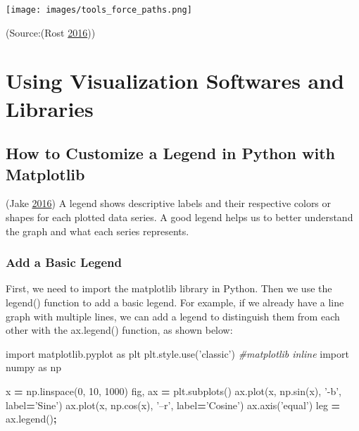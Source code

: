 \documentclass[]{book}
\newenvironment{Shaded}{\begin{snugshade}}{\end{snugshade}}
\newcommand{\CommentTok}[1]{\textcolor[rgb]{0.56,0.35,0.01}{\textit{#1}}}
\newcommand{\DecValTok}[1]{\textcolor[rgb]{0.00,0.00,0.81}{#1}}
\newcommand{\ImportTok}[1]{#1}
\newcommand{\NormalTok}[1]{#1}
\newcommand{\OperatorTok}[1]{\textcolor[rgb]{0.81,0.36,0.00}{\textbf{#1}}}
\newcommand{\StringTok}[1]{\textcolor[rgb]{0.31,0.60,0.02}{#1}}
\begin{document}
\texttt{[image: images/tools\_force\_paths.png]}

(Source:(Rost \protect\hyperlink{ref-different_tools}{2016}))

\hypertarget{using-visualization-softwares-and-libraries}{%
\section{Using Visualization Softwares and Libraries}\label{using-visualization-softwares-and-libraries}}

\hypertarget{how-to-customize-a-legend-in-python-with-matplotlib}{%
\subsection{How to Customize a Legend in Python with Matplotlib}\label{how-to-customize-a-legend-in-python-with-matplotlib}}

(Jake \protect\hyperlink{ref-PythonDataScienceHandbook}{2016})
A legend shows descriptive labels and their respective colors or shapes for each plotted data series. A good legend helps us to better understand the graph and what each series represents.

\hypertarget{add-a-basic-legend}{%
\subsubsection{Add a Basic Legend}\label{add-a-basic-legend}}

First, we need to import the matplotlib library in Python. Then we use the legend() function to add a basic legend. For example, if we already have a line graph with multiple lines, we can add a legend to distinguish them from each other with the ax.legend() function, as shown below:

\begin{Shaded}
\begin{Highlighting}[]
\ImportTok{import}\NormalTok{ matplotlib.pyplot }\ImportTok{as}\NormalTok{ plt}
\NormalTok{plt.style.use(}\StringTok{'classic'}\NormalTok{)}
\CommentTok{#matplotlib inline}
\ImportTok{import}\NormalTok{ numpy }\ImportTok{as}\NormalTok{ np}

\NormalTok{x }\OperatorTok{=}\NormalTok{ np.linspace(}\DecValTok{0}\NormalTok{, }\DecValTok{10}\NormalTok{, }\DecValTok{1000}\NormalTok{)}
\NormalTok{fig, ax }\OperatorTok{=}\NormalTok{ plt.subplots()}
\NormalTok{ax.plot(x, np.sin(x), }\StringTok{'-b'}\NormalTok{, label}\OperatorTok{=}\StringTok{'Sine'}\NormalTok{)}
\NormalTok{ax.plot(x, np.cos(x), }\StringTok{'--r'}\NormalTok{, label}\OperatorTok{=}\StringTok{'Cosine'}\NormalTok{)}
\NormalTok{ax.axis(}\StringTok{'equal'}\NormalTok{)}
\NormalTok{leg }\OperatorTok{=}\NormalTok{ ax.legend()}\OperatorTok{;}
\end{Highlighting}
\end{Shaded}
\end{document}

